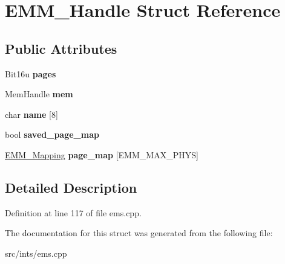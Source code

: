 \hypertarget{structEMM__Handle}{\section{E\-M\-M\-\_\-\-Handle Struct Reference}
\label{structEMM__Handle}
}
\subsection*{Public Attributes}
\begin{DoxyCompactItemize}
\item 
\hypertarget{structEMM__Handle_a8f6b6fdbb368b46a9092bf67ec268242}{Bit16u {\bfseries pages}}\label{structEMM__Handle_a8f6b6fdbb368b46a9092bf67ec268242}

\item 
\hypertarget{structEMM__Handle_ae2407285855af18647948ec831899e7b}{Mem\-Handle {\bfseries mem}}\label{structEMM__Handle_ae2407285855af18647948ec831899e7b}

\item 
\hypertarget{structEMM__Handle_a6fccb18b941ef48ded9a711b1c024103}{char {\bfseries name} \mbox{[}8\mbox{]}}\label{structEMM__Handle_a6fccb18b941ef48ded9a711b1c024103}

\item 
\hypertarget{structEMM__Handle_ae97a30d809922b3849311dc9ffe4d660}{bool {\bfseries saved\-\_\-page\-\_\-map}}\label{structEMM__Handle_ae97a30d809922b3849311dc9ffe4d660}

\item 
\hypertarget{structEMM__Handle_a1c900f12c39791084d9890233b8f10f3}{\hyperlink{structEMM__Mapping}{E\-M\-M\-\_\-\-Mapping} {\bfseries page\-\_\-map} \mbox{[}E\-M\-M\-\_\-\-M\-A\-X\-\_\-\-P\-H\-Y\-S\mbox{]}}\label{structEMM__Handle_a1c900f12c39791084d9890233b8f10f3}

\end{DoxyCompactItemize}


\subsection{Detailed Description}


Definition at line 117 of file ems.\-cpp.



The documentation for this struct was generated from the following file\-:\begin{DoxyCompactItemize}
\item 
src/ints/ems.\-cpp\end{DoxyCompactItemize}
